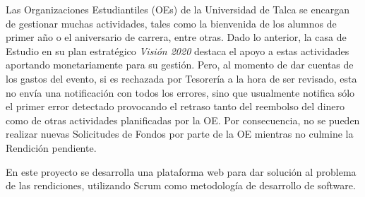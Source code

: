 \begin{resumen}

    
    Las Organizaciones Estudiantiles (OEs) de la Universidad de Talca se encargan de gestionar muchas actividades, tales como la bienvenida de los alumnos de primer año o el aniversario de carrera, entre otras. Dado lo anterior, la casa de Estudio en su plan estratégico \emph{Visión 2020} destaca el apoyo a estas actividades aportando monetariamente para su gestión. Pero, al momento de dar cuentas de los gastos del evento, si es rechazada por Tesorería a la hora de ser revisado, esta no envía una notificación con todos los errores, sino que usualmente notifica sólo el primer error detectado provocando el retraso tanto del reembolso del dinero como de otras actividades planificadas por la OE. Por consecuencia, no se pueden realizar nuevas Solicitudes de Fondos por parte de la OE mientras no culmine la Rendición pendiente.


    

    
    En este proyecto se desarrolla una plataforma web para dar solución al problema de las rendiciones, utilizando Scrum como metodología de desarrollo de software.


\end{resumen}
